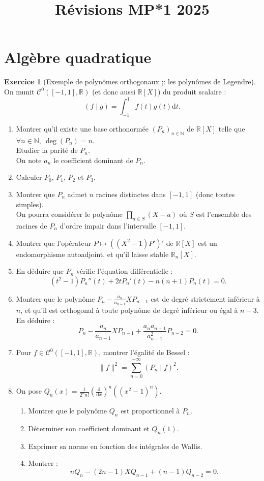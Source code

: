\documentclass[french]{article}
\title{Révisions MP*1 2025}
\date{}
\newcommand{\N}{\mathbb{N}}
\newcommand{\R}{\mathbb{R}}
\renewcommand{\d}{\text{d}}
\theoremstyle{definition}
\newtheorem{exo}{Exercice}
\begin{document}
	
\maketitle

\section*{Algèbre quadratique}

\begin{exo}[Exemple de polynômes orthogonaux ;: les polynômes de Legendre]
	On munit $\mathcal{C}^0([-1,1],\R)$ (et donc aussi $\R[X]$) du produit scalaire :
	$$(f\mid g)=\int_{-1}^{1}f(t)g(t)\d t.$$
	\begin{enumerate}
		\item Montrer qu'il existe une base orthonormée $(P_n)_{n\in\N}$ de $\R[X]$ telle que $\forall n\in\N,\ \deg(P_n)=n$.\\
		Etudier la parité de $P_n$.\\
		On note $a_n$ le coefficient dominant de $P_n$.
		\item Calculer $P_0$, $P_1$, $P_2$ et $P_3$.
		\item Montrer que $P_n$ admet $n$ racines distinctes dans $[-1,1]$ (donc toutes simples).\\
		On pourra considérer le polynôme $\displaystyle\prod_{a\in S}(X-a)$ où $S$ est l'ensemble des racines de $P_n$ d'ordre impair dans l'intervalle $[-1,1]$.
		\item Montrer que l'opérateur $P\mapsto((X^2-1)P')'$ de $\R[X]$ est un endomorphisme autoadjoint, et qu'il laisse stable $\R_n[X]$.
		\item En déduire que $P_n$ vérifie l'équation différentielle :
		$$(t^2-1)P_n''(t)+2tP_n'(t)-n(n+1)P_n(t)=0.$$
		\item Montrer que le polynôme $P_n-\displaystyle\frac{a_n}{a_{n-1}}XP_{n-1}$ est de degré strictement inférieur à $n$, et qu'il est orthogonal à toute polynôme de degré inférieur ou égal à $n-3$.\\
		En déduire :
		$$P_n-\frac{a_n}{a_{n-1}}XP_{n-1}+\frac{a_na_{n-1}}{a_{n-1}^2}P_{n-2}=0.$$
		\item Pour $f\in\mathcal{C}^0([-1,1],\R)$, montrer l'égalité de Bessel :
		$$\lVert f\rVert^2=\sum_{n=0}^{+\infty}(P_n\mid f)^2.$$
		\item On pose $Q_n(x)=\displaystyle\frac{1}{2^nn!}\left(\frac{\d}{\d x}\right)^n((x^2-1)^n)$.
		\begin{enumerate}[label=(\alph*)]
			\item Montrer que le polynôme $Q_n$ est proportionnel à $P_n$.
			\item Déterminer son coefficient dominant et $Q_n(1)$.
			\item Exprimer sa norme en fonction des intégrales de Wallis.
			\item Montrer :
			$$nQ_n-(2n-1)XQ_{n-1}+(n-1)Q_{n-2}=0.$$
		\end{enumerate}
	\end{enumerate}
\end{exo}
\end{document}

